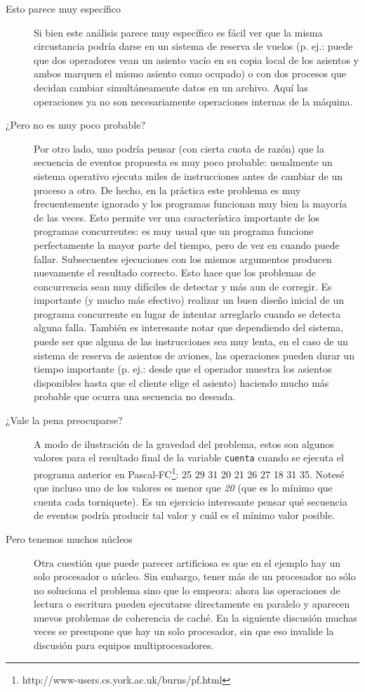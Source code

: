 \documentclass[11pt,fleqn]{book} %
\begin{document}
\begin{description}
\item[Esto parece muy específico] Si bien este análisis parece muy específico es fácil ver que la
  misma circustancia podría darse en un sistema de reserva de vuelos
  (p. ej.: puede que dos operadores vean un asiento vacío en su copia
  local de los asientos y ambos marquen el mismo asiento como ocupado)
  o con dos procesos que decidan cambiar simultáneamente datos en un
  archivo. Aquí las operaciones ya no son necesariamente operaciones
  internas de la máquina.
\item[¿Pero no es muy poco probable?] Por otro lado, uno podría pensar (con cierta cuota de razón) que la
  secuencia de eventos propuesta es muy poco probable: usualmente un
  sistema operativo ejecuta miles de instrucciones antes de cambiar de
  un proceso a otro. De hecho, en la práctica este problema es muy
  frecuentemente ignorado y los programas funcionan muy bien la mayoría
  de las veces. Esto permite ver una característica importante de los
  programas concurrentes: es muy usual que un programa funcione
  perfectamente la mayor parte del tiempo, pero de vez en cuando puede
  fallar. Subsecuentes ejecuciones con los mismos argumentos producen
  nuevamente el resultado correcto. Esto hace que los problemas de
  concurrencia sean muy difíciles de detectar y más aun de corregir. Es
  importante (y mucho más efectivo) realizar un buen diseño inicial de
  un programa concurrente en lugar de intentar arreglarlo cuando se
  detecta alguna falla. También es interesante notar que dependiendo del
  sistema, puede ser que alguna de las instrucciones sea muy lenta, en
  el caso de un sistema de reserva de asientos de aviones, las
  operaciones pueden durar un tiempo importante (p. ej.: desde que el
  operador muestra los asientos disponibles hasta que el cliente elige
  el asiento) haciendo mucho más probable que ocurra una secuencia no
  deseada.
\item[¿Vale la pena preocuparse?] A modo de ilustración de la gravedad del problema, estos son algunos
  valores para el resultado final de la variable \texttt{cuenta} cuando se
  ejecuta el programa anterior en Pascal-FC\footnote{http://www-users.cs.york.ac.uk/burns/pf.html }: 25 29 31 20 21 26 27
  18 31 35. Notesé que incluso uno de los valores es menor que \emph{20}
  (que es lo mínimo que cuenta cada torniquete). Es un ejercicio
  interesante pensar qué secuencia de eventos podría producir tal
  valor y cuál es el mínimo valor posible.
\item[Pero tenemos muchos núcleos] Otra cuestión que puede parecer artificiosa es que en el ejemplo hay
  un solo procesador o núcleo. Sin embargo, tener más de un procesador
  no sólo no soluciona el problema sino que lo empeora: ahora las
  operaciones de lectura o escritura pueden ejecutarse directamente en
  paralelo y aparecen nuevos problemas de coherencia de caché. En la
  siguiente discusión muchas veces se presupone que hay un solo
  procesador, sin que eso invalide la discusión para equipos
  multiprocesadores.
\end{description}
\end{document}
